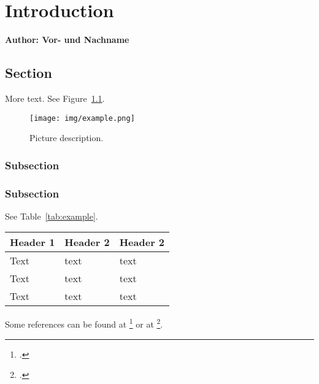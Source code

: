 \chapter{Introduction}

\textbf{Author: Vor- und Nachname}

\vspace{2mm}

\lipsum[1-3]

\section{Section}
More text. \lipsum[1] See Figure~\ref{pic:example}.

\begin{figure}[h]
	\centering
	\texttt{[image: img/example.png]}
	\caption{Picture description.}
	\label{pic:example}
\end{figure}

\subsection{Subsection}
\lipsum[1]

\subsection{Subsection}
\lipsum[1] See Table~\ref{tab:example}.

\begin{center}
	\begin{tabular}{| l | l | l |}
		\hline
		\bfseries Header 1 & \bfseries Header 2 & \bfseries Header 2 \\
		\hline
		Text & text & text \\
		\hline
		Text & text & text  \\
		\hline
		Text & text & text  \\
		\hline
	\end{tabular}
	\label{tab:example}
\end{center}

\lipsum[1] Some references can be found at \footcite{robo4you} or at \footcite{Hope_Learning_TensorFlow}.

\filbreak
